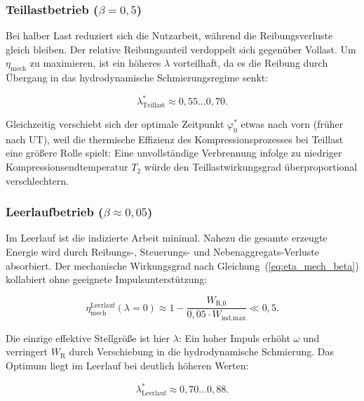﻿\documentclass[a4paper,12pt]{article}
\begin{document}
\subsubsection*{Teillastbetrieb ($\beta = 0{,}5$)}

Bei halber Last reduziert sich die Nutzarbeit, während die Reibungsverluste
gleich bleiben. Der relative Reibungsanteil verdoppelt sich gegenüber Vollast.
Um $\eta_\text{mech}$ zu maximieren, ist ein höheres $\lambda$ vorteilhaft,
da es die Reibung durch Übergang in das hydrodynamische Schmierungsregime senkt:

\begin{equation}
  \lambda^*_\text{Teillast} \approx 0{,}55 \ldots 0{,}70.
  \label{eq:lambda_teillast}
\end{equation}

Gleichzeitig verschiebt sich der optimale Zeitpunkt $\varphi_0^*$ etwas
nach vorn (früher nach UT), weil die thermische Effizienz des Kompressionsprozesses
bei Teillast eine größere Rolle spielt: Eine unvollständige Verbrennung infolge
zu niedriger Kompressionsendtemperatur $T_2$ würde den Teillastwirkungsgrad
überproportional verschlechtern.

\subsubsection*{Leerlaufbetrieb ($\beta \approx 0{,}05$)}

Im Leerlauf ist die indizierte Arbeit minimal. Nahezu die gesamte erzeugte
Energie wird durch Reibungs-, Steuerungs- und Nebenaggregats-Verluste absorbiert.
Der mechanische Wirkungsgrad nach Gleichung~(\ref{eq:eta_mech_beta}) kollabiert
ohne geeignete Impulsunterstützung:

\begin{equation}
  \eta_\text{mech}^\text{Leerlauf}(\lambda{=}0) \approx
    1 - \frac{W_\text{R,0}}{0{,}05 \cdot W_\text{ind,max}} \ll 0{,}5.
  \label{eq:eta_mech_leerlauf}
\end{equation}

Die einzige effektive Stellgröße ist hier $\lambda$: Ein hoher Impuls erhöht
$\omega$ und verringert $W_\text{R}$ durch Verschiebung in die hydrodynamische
Schmierung. Das Optimum liegt im Leerlauf bei deutlich höheren Werten:

\begin{equation}
  \lambda^*_\text{Leerlauf} \approx 0{,}70 \ldots 0{,}88.
  \label{eq:lambda_leerlauf}
\end{equation}
\end{document}
